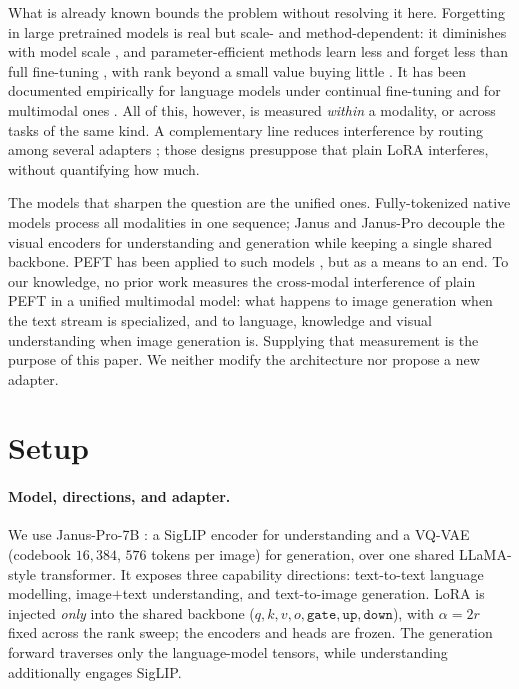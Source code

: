 \documentclass{article}
\begin{document}
What is already known bounds the problem without resolving it here. Forgetting in
large pretrained models is real but scale- and method-dependent: it diminishes
with model scale \citep{ramasesh2022scale}, and parameter-efficient methods learn
less and forget less than full fine-tuning \citep{biderman2024lora}, with rank
beyond a small value buying little \citep{zhang2024scalingmeetsfinetuning}. It has
been documented empirically for language models under continual fine-tuning
\citep{luo2023empirical} and for multimodal ones \citep{zhai2023investigating}.
All of this, however, is measured \emph{within} a modality, or across tasks of the
same kind. A complementary line reduces interference by routing among several
adapters \citep{dou2024loramoe, wu2024mole, li2024mixlora}; those designs
presuppose that plain LoRA interferes, without quantifying how much.

The models that sharpen the question are the unified ones. Fully-tokenized native
models \citep{chameleon2024, bachmann20244m21, lu2024unifiedio2} process all
modalities in one sequence; Janus and Janus-Pro \citep{wu2024janus, januspro}
decouple the visual encoders for understanding and generation while keeping a
single shared backbone. PEFT has been applied to such models
\citep{chern2024anole, serra2024narrowgate, wang2025vora}, but as a means to an
end. To our knowledge, no prior work measures the cross-modal interference of
plain PEFT in a unified multimodal model: what happens to image generation when
the text stream is specialized, and to language, knowledge and visual
understanding when image generation is. Supplying that measurement is the purpose
of this paper. We neither modify the architecture nor propose a new adapter.

\section{Setup}
\label{sec:setup}
\paragraph{Model, directions, and adapter.}
We use Janus-Pro-7B \citep{januspro}: a SigLIP encoder for understanding and a
VQ-VAE (codebook $16{,}384$, $576$ tokens per image) for generation, over one
shared LLaMA-style transformer. It exposes three capability directions:
text-to-text language modelling, image$+$text understanding, and text-to-image
generation. LoRA is injected \emph{only} into the shared backbone
($q,k,v,o,\texttt{gate},\texttt{up},\texttt{down}$), with $\alpha=2r$ fixed
across the rank sweep; the encoders and heads are frozen. The generation forward
traverses only the language-model tensors, while understanding additionally
engages SigLIP.
\end{document}
